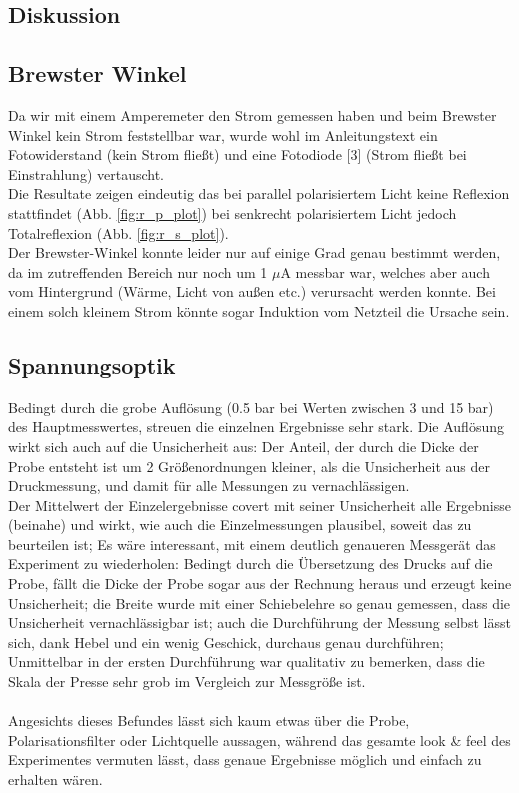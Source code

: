 \documentclass[12pt,a4paper]{article}
\begin{document}
\begin{multicols}{2}
\section{Diskussion}

\subsection{Brewster Winkel}
Da wir mit einem Amperemeter den Strom gemessen haben und beim Brewster Winkel kein Strom feststellbar war, wurde wohl im Anleitungstext ein Fotowiderstand (kein Strom fließt) und eine Fotodiode [3] (Strom fließt bei Einstrahlung) vertauscht. \\
Die Resultate zeigen eindeutig das bei parallel polarisiertem Licht keine Reflexion stattfindet  (Abb. \ref{fig:r_p_plot}) bei senkrecht polarisiertem Licht jedoch Totalreflexion (Abb. \ref{fig:r_s_plot}). \\
Der Brewster-Winkel konnte leider nur auf einige Grad genau bestimmt werden, da im zutreffenden Bereich nur noch um 1 $\mu$A messbar war, welches aber auch vom Hintergrund (Wärme, Licht von außen etc.) verursacht werden konnte. Bei einem solch kleinem Strom könnte sogar Induktion vom Netzteil die Ursache sein.


\subsection{Spannungsoptik}

Bedingt durch die grobe Auflösung (0.5 bar bei Werten zwischen 3 und 15 bar) des Hauptmesswertes, streuen die einzelnen Ergebnisse sehr stark. Die Auflösung wirkt sich auch auf die Unsicherheit aus: Der Anteil, der durch die Dicke der Probe entsteht ist um 2 Größenordnungen kleiner, als die Unsicherheit aus der Druckmessung, und damit für alle Messungen zu vernachlässigen.\\
Der Mittelwert der Einzelergebnisse covert mit seiner Unsicherheit alle Ergebnisse (beinahe) und wirkt, wie auch die Einzelmessungen plausibel, soweit das zu beurteilen ist; Es wäre interessant, mit einem deutlich genaueren Messgerät das Experiment zu wiederholen:
Bedingt durch die Übersetzung des Drucks auf die Probe, fällt die Dicke der Probe sogar aus der Rechnung heraus und erzeugt keine Unsicherheit; die Breite wurde mit einer Schiebelehre so genau gemessen, dass die Unsicherheit vernachlässigbar ist; auch die Durchführung der Messung selbst lässt sich, dank Hebel und ein wenig Geschick, durchaus genau durchführen;\\
Unmittelbar in der ersten Durchführung war qualitativ zu bemerken, dass die Skala der Presse sehr grob im Vergleich zur Messgröße ist.\\
\\
Angesichts dieses Befundes lässt sich kaum etwas über die Probe, Polarisationsfilter oder Lichtquelle aussagen, während das gesamte look \& feel des Experimentes vermuten lässt, dass genaue Ergebnisse möglich und einfach zu erhalten wären.


\end{multicols}
\end{document}
